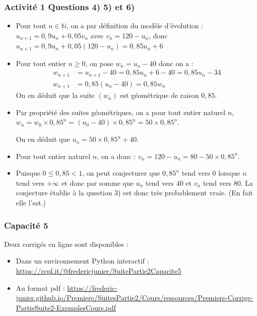 \documentclass[11pt, hyperref={urlcolor=red,%
            linkcolor=blue, %
            colorlinks=true}]{beamer}
\newcommand{\N}{\mathbb{N}}
\newcommand{\suite}[1]{\ensuremath{\left(#1_{n}\right)}}
\begin{document}
\begin{frame}
\frametitle{Activité 1 Questions 4) 5) et 6)}


\begin{itemize}
\pause \item  Pour tout $n\in \N$,  on a par définition du modèle d'évolution : $u_{n+1}=0,9u_{n}+0,05v_{n}$ avec $v_{n}=120-u_{n}$, donc $u_{n+1}=0,9u_{n}+0,05(120-u_{n})=0,85u_{n}+6$


\pause \item Pour tout entier $n \geqslant 0$, on pose $w_{n}=u_{n}-40$ donc on a  :
\begin{align*}
w_{n+1}&=u_{n+1}-40=0,85u_{n}+6-40=0,85u_{n}-34\\
w_{n+1}&=0,85(u_{n}-40)=0,85w_{n}
\end{align*}
On en déduit que la suite $\suite{w}$ est géométrique de raison $0,85$.
\pause \item Par propriété des suites géométriques, on a pour tout entier naturel $n$, $w_{n}=w_{0}\times 0,85^{n}=(u_{0}-40)\times 0,85^{n}=50\times 0,85^{n}$.

On en déduit que $u_n=50\times 0,85^{n}+40$.


\pause \item Pour tout entier naturel $n$, on a donc :  $v_{n}=120-u_{n}=80-50\times 0,85^{n}$.

\item Puisque $0 \leqslant 0,85 < 1$, on peut conjecturer que $0,85^{n}$ tend vers $0$ lorsque $n$tend vers $+\infty$ et donc par somme que $u_{n}$ tend vers $40$ et $v_{n}$ tend vers $80$. La conjecture établie à la question 3) est donc très probablement vraie. (En fait elle l'est.)

\end{itemize}

\end{frame}




\begin{frame}
\frametitle{Capacité 5}
\label{capacite5}

Deux corrigés en ligne sont disponibles :

\begin{itemize}
	\item Dans un environnement Python interactif : \href{https://repl.it/@fredericjunier/SuitePartie2Capacite5}{https://repl.it/@fredericjunier/SuitePartie2Capacite5}
	\item Au format pdf : \href{https://frederic-junier.github.io/Premiere/SuitesPartie2/Cours/ressources/Premiere-Corrige-PartieSuite2-ExemplesCours.pdf}{https://frederic-junier.github.io/Premiere/SuitesPartie2/Cours/ressources/Premiere-Corrige-PartieSuite2-ExemplesCours.pdf}

\end{itemize}

\end{frame}
\end{document}
